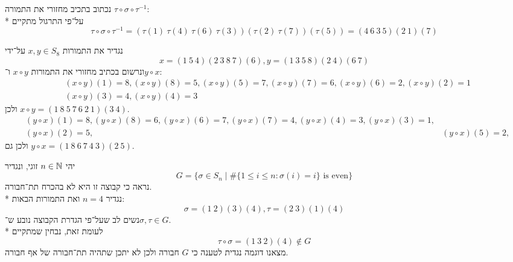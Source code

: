 \Subquestion{}
נכתוב בתכיב מחזורי את התמורה $\tau \circ \sigma \circ \tau^{-1}$: \\*
על־פי התרגול מתקיים
\[
	\tau \circ \sigma \circ \tau^{-1}
	= (\tau(1) \  \tau(4) \  \tau(6) \  \tau(3))(\tau(2) \  \tau(7))(\tau(5))
	= (4 \  6 \  3 \  5)(2 \  1)(7)
\]

\Subquestion{}
נגדיר את התמורות $x, y \in S_8$ על־ידי
\[
	x = (1\ 5\ 4)(2\ 3\ 8\ 7)(6), y = (1\ 3\ 5\ 8)(2\ 4)(6\ 7)
\]
ונרשום בכתיב מחזורי את התמורות $x \circ y$ ו־$y \circ x$:
\begin{align*}
	& (x \circ y)(1) = 8,
	(x \circ y)(8) = 5,
	(x \circ y)(5) = 7,
	(x \circ y)(7) = 6,
	(x \circ y)(6) = 2,
	(x \circ y)(2) = 1 \\
	& (x \circ y)(3) = 4,
	(x \circ y)(4) = 3
\end{align*}
ולכן $x \circ y = (1\ 8\ 5\ 7\ 6\ 2\ 1)(3\ 4)$.
\begin{align*}
	& (y \circ x)(1) = 8,
	(y \circ x)(8) = 6,
	(y \circ x)(6) = 7,
	(y \circ x)(7) = 4,
	(y \circ x)(4) = 3,
	(y \circ x)(3) = 1, \\
	& (y \circ x)(2) = 5,
	& (y \circ x)(5) = 2,
\end{align*}
ולכן גם $y \circ x = (1\ 8\ 6\ 7\ 4\ 3)(2\ 5)$.

\Subquestion{}
יהי $n \in \mathbb{N}$ זוגי, ונגדיר
\[
	G = \{ \sigma \in S_n \mid \#\{1 \le i \le n : \sigma(i) = i\} \text{ is even}\}
\]
נראה כי קבוצה זו היא לא בהכרח תת־חבורה. \\*
נגדיר $n = 4$ ואת התמורות הבאות:
\[
	\sigma = (1\ 2)(3)(4), \tau = (2\ 3)(1)(4)
\]
נשים לב שעל־פי הגדרת הקבוצה נובע ש־$\sigma, \tau \in G$. \\*
לעומת זאת, נבחין שמתקיים
\[
	\tau \circ \sigma = (1\ 3\ 2)(4) \not\in G
\]
מצאנו דוגמה נגדית לטענה כי $G$ חבורה ולכן לא יתכן שתהיה תת־חבורה של אף חבורה.



